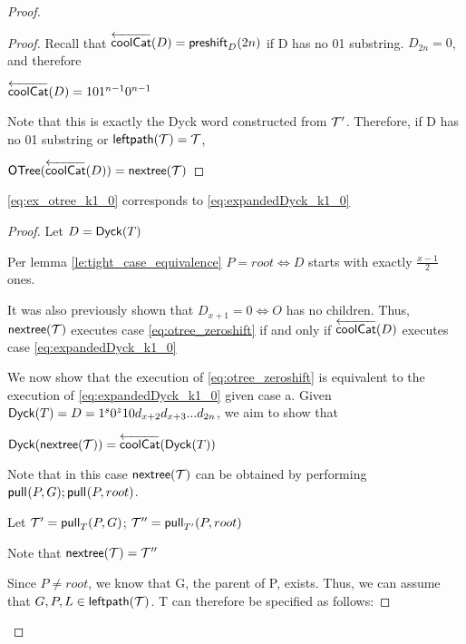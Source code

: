 \begin{proof}
\begin{proof}
    Recall that $\coolCat{D}=\preshift{D}{2n}$ if D has no 01 substring. $D_{2n}=0$, and therefore 

    $\coolCat{D}=101^{n-1}0^{n-1}$
     
     Note that this is exactly the Dyck word constructed from $\tree{T}'$.  Therefore, if D has no 01 substring or $\leftdown{T}=\tree{T}$, 

     $\otree{\coolCat{D}}=\nextTree{T}$

\end{proof}
\begin{lemma}
    \ref{eq:ex_otree_k1_0} corresponds to \ref{eq:expandedDyck_k1_0}
\end{lemma}
\begin{proof}
    Let $D=\dyck{T}$

    Per lemma \ref{le:tight_case_equivalence} $P=root \iff D$ starts with exactly $\frac{x-1}{2}$ ones.  

    It was also previously shown that $D_{x+1}=0 \iff O$ has no children.  
    Thus, $\nextTree{T}$ executes case \ref{eq:otree_zeroshift} 
    if and only if $\coolCat{D}$ executes case   \ref{eq:expandedDyck_k1_0}

    \bigskip

    We now show that the execution of \ref{eq:otree_zeroshift} is equivalent to the execution of \ref{eq:expandedDyck_k1_0} given case a.
    Given $\dyck{T}=D=1^s0^{z}10d_{x+2}d_{x+3}...d_{2n}$, we aim to show that 

    $\dyck{\nextTree{T}}=\coolCat{\dyck{T}}$
    \bigskip

    Note that in this case $\nextTree{T}$ can be obtained by performing $\poppush{P}{G};\poppush{P}{root}$. 

	    Let $\tree{T}'=\poppush[T]{P}{G}$; $\tree{T}''=\poppush[T']{P}{root}$

	    Note that $\nextTree{T}=\tree{T}''$

    Since $P \ne root$, we know that G, the parent of P, exists. 
    Thus, we can assume that $G,P,L \in \leftdown{T}$.  T can therefore be specified as follows: 





\end{proof}
\end{proof}
